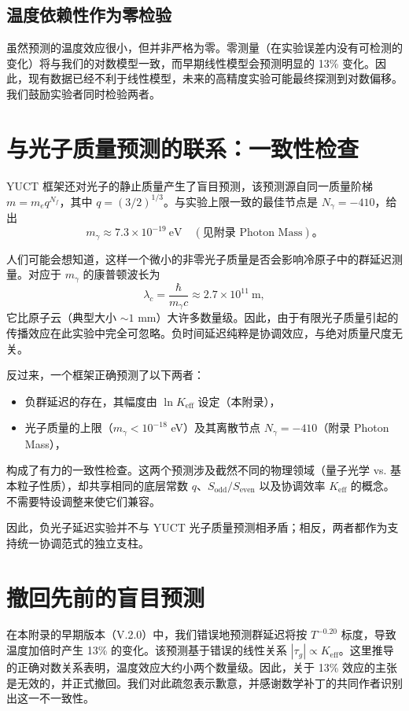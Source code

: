 \documentclass[12pt,a4paper]{article}
\newcommand{\Keff}{K_{\mathrm{eff}}}
\begin{document}
	\subsection{温度依赖性作为零检验}
	
	虽然预测的温度效应很小，但并非严格为零。零测量（在实验误差内没有可检测的变化）将与我们的对数模型一致，而早期线性模型会预测明显的 13\% 变化。因此，现有数据已经不利于线性模型，未来的高精度实验可能最终探测到对数偏移。我们鼓励实验者同时检验两者。
	
	\section{与光子质量预测的联系：一致性检查}
	\label{sec:photon_mass_consistency}
	
	YUCT 框架还对光子的静止质量产生了盲目预测，该预测源自同一质量阶梯 \(m = m_e q^{N_f}\)，其中 \(q=(3/2)^{1/3}\)。与实验上限一致的最佳节点是 \(N_\gamma = -410\)，给出
	\[
	m_\gamma \approx 7.3 \times 10^{-19}~\text{eV} \quad (\text{见附录 Photon Mass})。
	\]
	
	人们可能会想知道，这样一个微小的非零光子质量是否会影响冷原子中的群延迟测量。对应于 \(m_\gamma\) 的康普顿波长为
	\[
	\lambda_c = \frac{\hbar}{m_\gamma c} \approx 2.7\times10^{11}~\text{m},
	\]
	它比原子云（典型大小 \(\sim 1\) mm）大许多数量级。因此，由于有限光子质量引起的传播效应在此实验中完全可忽略。负时间延迟纯粹是协调效应，与绝对质量尺度无关。
	
	反过来，一个框架正确预测了以下两者：
	\begin{itemize}
		\item 负群延迟的存在，其幅度由 \(\ln\Keff\) 设定（本附录），
		\item 光子质量的上限（\(m_\gamma < 10^{-18}\) eV）及其离散节点 \(N_\gamma = -410\)（附录 Photon Mass），
	\end{itemize}
	构成了有力的一致性检查。这两个预测涉及截然不同的物理领域（量子光学 vs. 基本粒子性质），却共享相同的底层常数 \(q\)、\(S_{\mathrm{odd}}/S_{\mathrm{even}}\) 以及协调效率 \(\Keff\) 的概念。不需要特设调整来使它们兼容。
	
	因此，负光子延迟实验并不与 YUCT 光子质量预测相矛盾；相反，两者都作为支持统一协调范式的独立支柱。
	
	\section{撤回先前的盲目预测}
	
	在本附录的早期版本（V.2.0）中，我们错误地预测群延迟将按 \(T^{-0.20}\) 标度，导致温度加倍时产生 13\% 的变化。该预测基于错误的线性关系 \(|\tau_g| \propto \Keff\)。这里推导的正确对数关系表明，温度效应大约小两个数量级。因此，关于 13\% 效应的主张是无效的，并正式撤回。我们对此疏忽表示歉意，并感谢数学补丁的共同作者识别出这一不一致性。
	
\end{document}

